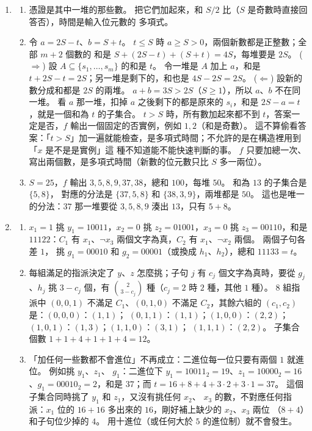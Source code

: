 \begin{enumerate}
\item
\begin{enumerate}
\item 憑證是其中一堆的那些數。 把它們加起來，和 $S/2$ 比（$S$ 是奇數時直接回答否），時間是輸入位元數的
多項式。
\item 令 $a = 2S - t$、$b = S + t$。 $t \le S$ 時 $a \ge S > 0$，兩個新數都是正整數；全部 $m + 2$ 個數的
和是 $S + (2S - t) + (S + t) = 4S$，每堆要是 $2S$。
($\Rightarrow$) 設 $A \subseteq \{s_1, \ldots, s_m\}$ 的和是 $t$。 令一堆是 $A$ 加上 $a$，和是
$t + 2S - t = 2S$；另一堆是剩下的，和也是 $4S - 2S = 2S$。
($\Leftarrow$) 設新的數分成和都是 $2S$ 的兩堆。 $a + b = 3S > 2S$（$S \ge 1$），所以 $a$、$b$ 不在同一堆。
看 $a$ 那一堆，扣掉 $a$ 之後剩下的都是原來的 $s_i$，和是 $2S - a = t$，就是一個和為 $t$ 的子集合。
$t > S$ 時，所有數加起來都不到 $t$，答案一定是否，$f$ 輸出一個固定的否實例，例如 $1, 2$（和是奇數）。
這不算偷看答案：「$t > S$」加一遍就能檢查，是多項式時間；不允許的是在構造裡用到「$x$ 是不是是實例」這
種不知道能不能快速判斷的事。 $f$ 只要加總一次、寫出兩個數，是多項式時間（新數的位元數只比 $S$ 多一兩位）。
\item $S = 25$，$f$ 輸出 $3, 5, 8, 9, 37, 38$，總和 $100$，每堆 $50$。 和為 $13$ 的子集合是 $\{5, 8\}$，
對應的分法是 $\{37, 5, 8\}$ 和 $\{38, 3, 9\}$，兩堆都是 $50$。 這也是唯一的分法：$37$ 那一堆要從
$3, 5, 8, 9$ 湊出 $13$，只有 $5 + 8$。
\end{enumerate}

\item
\begin{enumerate}
\item $x_1 = 1$ 挑 $y_1 = 10011$，$x_2 = 0$ 挑 $z_2 = 01001$，$x_3 = 0$ 挑 $z_3 = 00110$，和是
$11122$：$C_1$ 有 $x_1$、$\neg x_3$ 兩個文字為真，$C_2$ 有 $x_1$、$\neg x_2$ 兩個。 兩個子句各差 $1$，
挑 $g_1 = 00010$ 和 $g_2 = 00001$（或換成 $h_1$、$h_2$），總和 $11133 = t$。
\item 每組滿足的指派決定了 $y$、$z$ 怎麼挑；子句 $j$ 有 $c_j$ 個文字為真時，要從 $g_j$、$h_j$ 挑
$3 - c_j$ 個，有 $\binom{2}{3 - c_j}$ 種（$c_j = 2$ 時 $2$ 種，其他 $1$ 種）。 $8$ 組指派中 $(0, 0, 1)$
不滿足 $C_1$、$(0, 1, 0)$ 不滿足 $C_2$，其餘六組的 $(c_1, c_2)$ 是：$(0, 0, 0)$：$(1, 1)$；
$(0, 1, 1)$：$(1, 1)$；$(1, 0, 0)$：$(2, 2)$；$(1, 0, 1)$：$(1, 3)$；$(1, 1, 0)$：$(3, 1)$；
$(1, 1, 1)$：$(2, 2)$。 子集合個數 $1 + 1 + 4 + 1 + 1 + 4 = 12$。
\item 「加任何一些數都不會進位」不再成立：二進位每一位只要有兩個 $1$ 就進位。 例如挑 $y_1$、$z_1$、
$g_1$：二進位下 $y_1 = 10011_2 = 19$、$z_1 = 10000_2 = 16$、$g_1 = 00010_2 = 2$，和是 $37$；而
$t = 16 + 8 + 4 + 3 \cdot 2 + 3 \cdot 1 = 37$。 這個子集合同時挑了 $y_1$ 和 $z_1$，又沒有挑任何 $x_2$、
$x_3$ 的數，不對應任何指派：$x_1$ 位的 $16 + 16$ 多出來的 $16$，剛好補上缺少的 $x_2$、$x_3$ 兩位
（$8 + 4$）和子句位少掉的 $4$。 用十進位（或任何大於 $5$ 的進位制）就不會發生。
\end{enumerate}


\end{enumerate}
